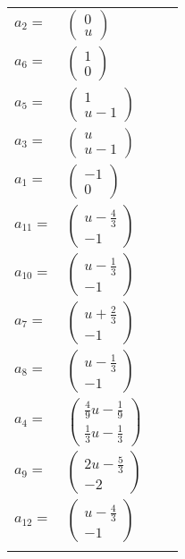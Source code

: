 \documentclass[1p]{elsarticle_modified}
\theoremstyle{definition}
\begin{document}
\begin{tabular}{m{7pt} m{180pt} m{7pt} m{180pt} }
\flushright $a_{2}=$&$\begin{pmatrix}0\\u\end{pmatrix}$ \\
\flushright $a_{6}=$&$\begin{pmatrix}1\\0\end{pmatrix}$ \\
\flushright $a_{5}=$&$\begin{pmatrix}1\\u-1\end{pmatrix}$ \\
\flushright $a_{3}=$&$\begin{pmatrix}u\\u-1\end{pmatrix}$ \\
\flushright $a_{1}=$&$\begin{pmatrix}-1\\0\end{pmatrix}$ \\
\flushright $a_{11}=$&$\begin{pmatrix}u-\frac{4}{3}\\-1\end{pmatrix}$ \\
\flushright $a_{10}=$&$\begin{pmatrix}u-\frac{1}{3}\\-1\end{pmatrix}$ \\
\flushright $a_{7}=$&$\begin{pmatrix}u+\frac{2}{3}\\-1\end{pmatrix}$ \\
\flushright $a_{8}=$&$\begin{pmatrix}u-\frac{1}{3}\\-1\end{pmatrix}$ \\
\flushright $a_{4}=$&$\begin{pmatrix}\frac{4}{9} u-\frac{1}{9}\\\frac{1}{3} u-\frac{1}{3}\end{pmatrix}$ \\
\flushright $a_{9}=$&$\begin{pmatrix}2 u-\frac{5}{3}\\-2\end{pmatrix}$ \\
\flushright $a_{12}=$&$\begin{pmatrix}u-\frac{4}{3}\\-1\end{pmatrix}$\\&\end{tabular}
\end{document}
